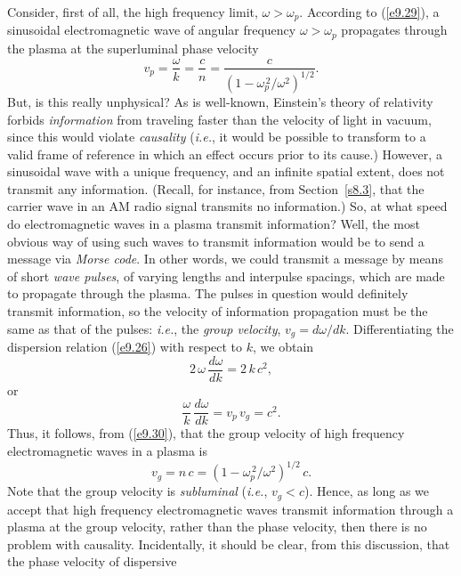 Consider, first of all,  the  high frequency limit, $\omega>\omega_p$. According to
(\ref{e9.29}),   a sinusoidal electromagnetic wave of angular frequency $\omega>\omega_p$ propagates through the plasma
at the superluminal phase velocity
\begin{equation}\label{e9.30}
v_p = \frac{\omega}{k} = \frac{c}{n}=\frac{c}{(1-\omega_p^{\,2}/\omega^2)^{1/2}}.
\end{equation}
 But, is this really unphysical? 
As is well-known, Einstein's theory of relativity forbids {\em information}\/ from traveling faster
than the velocity of light in vacuum, since this would violate {\em causality}\/ ({\em i.e.}, it would be possible to transform to a valid frame of reference in which an effect occurs prior to its cause.) However, a sinusoidal wave with a unique
frequency, and an infinite spatial extent, does not transmit any information. (Recall, for
instance, from Section~\ref{s8.3}, that the carrier wave in an AM radio signal transmits no information.) So, at what speed do electromagnetic waves in a plasma transmit information? Well,
the most obvious way of using such waves to transmit information  would be to send a message via {\em Morse code}. In other words, we could
transmit a message by means of short {\em wave pulses}, of varying lengths and interpulse spacings, which are made to propagate through the plasma. The pulses in question would definitely transmit information, so the velocity of information propagation must be the same as that of the pulses: {\em i.e.}, the {\em group velocity}, $v_g=d\omega/dk$. Differentiating the dispersion relation (\ref{e9.26}) with respect to
$k$, we obtain
\begin{equation}
2\,\omega\,\frac{d\omega}{dk} = 2\,k\,c^2,
\end{equation}
or
\begin{equation}
\frac{\omega}{k}\,\frac{d\omega}{dk }= v_p\,v_g = c^2.
\end{equation}
Thus, it follows, from (\ref{e9.30}), that the group velocity of high frequency electromagnetic waves in a plasma is
\begin{equation}\label{e9.33}
v_g = n\,c=(1-\omega_p^{\,2}/\omega^2)^{1/2}\,c.
\end{equation}
Note that the group velocity is {\em subluminal} ({\em i.e.}, $v_g<c$). Hence, as
long as we accept that high frequency electromagnetic waves transmit information through a plasma at
the group velocity, rather than the phase velocity, then there is no problem with causality. 
Incidentally, it should be clear, from this discussion, that the phase velocity of dispersive 

